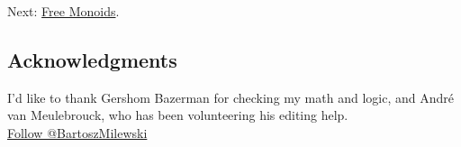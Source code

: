 Next: \href{https://bartoszmilewski.com/2015/07/21/free-monoids/}{Free
Monoids}.

\subsection{Acknowledgments}\label{acknowledgments}

I'd like to thank Gershom Bazerman for checking my math and logic, and
André van Meulebrouck, who has been volunteering his editing help.\\
\href{https://twitter.com/BartoszMilewski}{Follow @BartoszMilewski}
